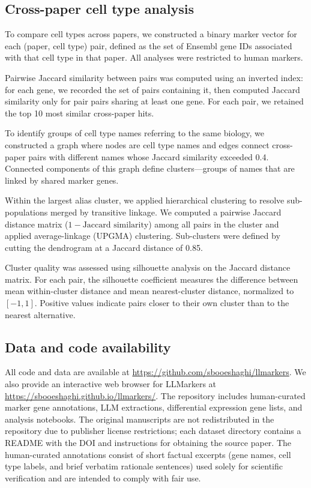 \documentclass[10pt,twocolumn]{article}
\theoremstyle{plain}
\theoremstyle{definition}
\theoremstyle{remark}
\begin{document}
\subsection{Cross-paper cell type analysis}

To compare cell types across papers, we constructed a binary marker vector for each (paper, cell type) pair, defined as the set of Ensembl gene IDs associated with that cell type in that paper.  All analyses were restricted to human markers.

Pairwise Jaccard similarity between pairs was computed using an inverted index: for each gene, we recorded the set of pairs containing it, then computed Jaccard similarity only for pair pairs sharing at least one gene. For each pair, we retained the top 10 most similar cross-paper hits.

To identify groups of cell type names referring to the same biology, we constructed a graph where nodes are cell type names and edges connect cross-paper pairs with different names whose Jaccard similarity exceeded 0.4. Connected components of this graph define clusters---groups of names that are linked by shared marker genes.

Within the largest alias cluster, we applied hierarchical clustering to resolve sub-populations merged by transitive linkage. We computed a pairwise Jaccard distance matrix ($1 - \text{Jaccard similarity}$) among all pairs in the cluster and applied average-linkage (UPGMA) clustering. Sub-clusters were defined by cutting the dendrogram at a Jaccard distance of 0.85.

Cluster quality was assessed using silhouette analysis on the Jaccard distance matrix. For each pair, the silhouette coefficient measures the difference between mean within-cluster distance and mean nearest-cluster distance, normalized to $[-1, 1]$. Positive values indicate pairs closer to their own cluster than to the nearest alternative.

\subsection{Data and code availability}

All code and data are available at \url{https://github.com/sbooeshaghi/llmarkers}. We also provide an interactive web browser for LLMarkers at \url{https://sbooeshaghi.github.io/llmarkers/}. The repository includes human-curated marker gene annotations, LLM extractions, differential expression gene lists, and analysis notebooks. The original manuscripts are not redistributed in the repository due to publisher license restrictions; each dataset directory contains a README with the DOI and instructions for obtaining the source paper. The human-curated annotations consist of short factual excerpts (gene names, cell type labels, and brief verbatim rationale sentences) used solely for scientific verification and are intended to comply with fair use.
\end{document}
